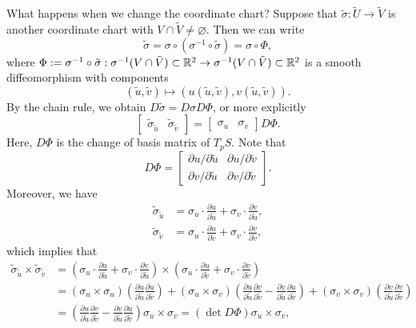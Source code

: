 What happens when we change the coordinate chart? Suppose that 
$\tilde\sigma : \tilde U \to \tilde V$ is another coordinate chart with 
$V \cap \tilde V \neq \varnothing$. Then we can write 
\[ \tilde \sigma = \sigma \circ (\sigma^{-1} \circ \tilde\sigma) = \sigma \circ \Phi, \] 
where $\Phi := \sigma^{-1} \circ \tilde\sigma : \sigma^{-1}(V \cap \tilde V) 
\subset \mathbb{R}^2 \to \sigma^{-1}(V \cap \tilde V) \subset \mathbb{R}^2$ is a smooth
diffeomorphism with components 
\[ (\tilde u, \tilde v) \mapsto (u(\tilde u, \tilde v), v(\tilde u, \tilde v)). \] 
By the chain rule, we obtain $D\tilde\sigma = D\sigma D\Phi$, or more explicitly
\[ \left[ \begin{array}{c|c}
    \!\!\!\tilde\sigma_{\tilde u} & \tilde\sigma_{\tilde v}\!\!\!
\end{array} \right] = \left[ \begin{array}{c|c}
    \!\!\!\sigma_u & \sigma_v\!\!\!
\end{array} \right] \! D\Phi. \] 
Here, $D\Phi$ is the change of basis matrix of $T_pS$. Note that 
\[ D\Phi = \begin{bmatrix}
    \partial u/\partial\tilde u & \partial u/\partial\tilde v \\
    \partial v/\partial\tilde u & \partial v/\partial\tilde v
\end{bmatrix}. \] 
Moreover, we have 
\begin{align*} 
    \tilde\sigma_{\tilde u} &= \sigma_u \cdot \frac{\partial u}{\partial\tilde u} 
    + \sigma_v \cdot \frac{\partial v}{\partial\tilde u}, \\ 
    \tilde\sigma_{\tilde v} &= \sigma_u \cdot \frac{\partial u}{\partial\tilde v} 
    + \sigma_v \cdot \frac{\partial v}{\partial\tilde v},
\end{align*} 
which implies that 
\begin{align*}
    \tilde\sigma_{\tilde u} \times \tilde\sigma_{\tilde v}
    &= \left( \sigma_u \cdot \frac{\partial u}{\partial\tilde u} 
    + \sigma_v \cdot \frac{\partial v}{\partial\tilde u} \right) 
    \times \left( \sigma_u \cdot \frac{\partial u}{\partial\tilde v} 
    + \sigma_v \cdot \frac{\partial v}{\partial\tilde v} \right) \\ 
    &= (\sigma_u \times \sigma_u) \left( \frac{\partial u}{\partial\tilde u}
    \frac{\partial u}{\partial\tilde v} \right) + (\sigma_u \times \sigma_v) 
    \left( \frac{\partial u}{\partial\tilde u} \frac{\partial v}{\partial\tilde v}
    - \frac{\partial v}{\partial\tilde u} \frac{\partial u}{\partial\tilde v} \right) 
    + (\sigma_v \times \sigma_v) \left( \frac{\partial v}{\partial\tilde u}
    \frac{\partial v}{\partial\tilde v} \right) \\ 
    &= \left( \frac{\partial u}{\partial\tilde u} \frac{\partial v}{\partial\tilde v}
    - \frac{\partial v}{\partial\tilde u} \frac{\partial u}{\partial\tilde v} \right) 
    \sigma_u \times \sigma_v = (\det D\Phi) \sigma_u \times \sigma_v,
\end{align*}
